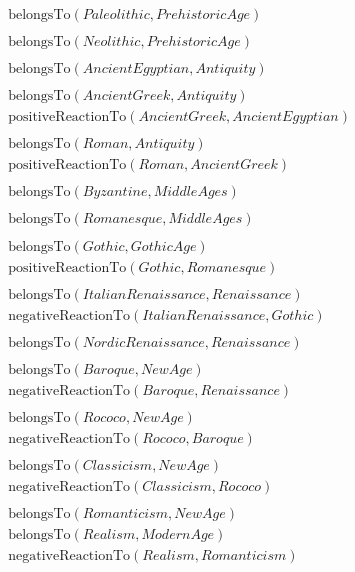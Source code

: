 \documentclass{article}
\begin{document}
\begin{align*}
  &\text{belongsTo}(Paleolithic, PrehistoricAge)\\\\
  &\text{belongsTo}(Neolithic, PrehistoricAge)\\\\
  &\text{belongsTo}(AncientEgyptian, Antiquity)\\\\
  &\text{belongsTo}(AncientGreek, Antiquity) \\
  &\text{positiveReactionTo}(AncientGreek, AncientEgyptian)\\\\
  &\text{belongsTo}(Roman, Antiquity) \\
  &\text{positiveReactionTo}(Roman, AncientGreek)\\\\
  &\text{belongsTo}(Byzantine, MiddleAges)\\\\
  &\text{belongsTo}(Romanesque, MiddleAges)\\\\
  &\text{belongsTo}(Gothic, GothicAge) \\
  &\text{positiveReactionTo}(Gothic, Romanesque)\\\\
  &\text{belongsTo}(ItalianRenaissance, Renaissance) \\
  &\text{negativeReactionTo}(ItalianRenaissance, Gothic)\\\\
  &\text{belongsTo}(NordicRenaissance, Renaissance)\\\\
  &\text{belongsTo}(Baroque, NewAge) \\
  &\text{negativeReactionTo}(Baroque, Renaissance)\\\\
  &\text{belongsTo}(Rococo, NewAge) \\
  &\text{negativeReactionTo}(Rococo, Baroque)\\\\
  &\text{belongsTo}(Classicism, NewAge) \\
  &\text{negativeReactionTo}(Classicism, Rococo)\\\\
  &\text{belongsTo}(Romanticism, NewAge) \\
  &\text{belongsTo}(Realism, ModernAge) \\
  &\text{negativeReactionTo}(Realism, Romanticism)\\\\

\end{align*}
\end{document}
